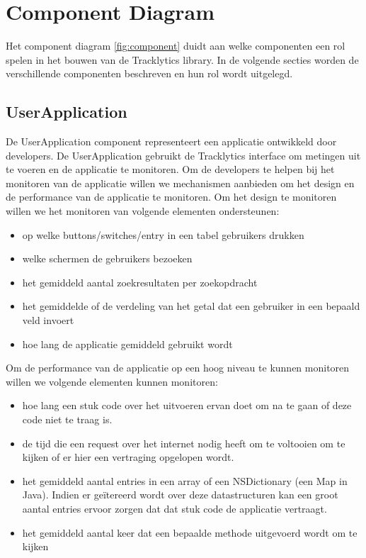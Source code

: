 \section{Component Diagram}
Het component diagram \ref{fig:component} duidt aan welke componenten een rol spelen in het bouwen van de Tracklytics library. In de volgende secties worden de verschillende componenten beschreven en hun rol wordt uitgelegd.


\subsection{UserApplication}
De UserApplication component representeert een applicatie ontwikkeld door developers. De UserApplication gebruikt de Tracklytics interface om metingen uit te voeren en de applicatie te monitoren. Om de developers te helpen bij het monitoren van de applicatie willen we mechanismen aanbieden om het design en de performance van de applicatie te monitoren. Om het design te monitoren willen we het monitoren van volgende elementen ondersteunen:
\begin{itemize}
\item op welke buttons/switches/entry in een tabel gebruikers drukken
\item welke schermen de gebruikers bezoeken
\item het gemiddeld aantal zoekresultaten per zoekopdracht
\item het gemiddelde of de verdeling van het getal dat een gebruiker in een bepaald veld invoert
\item hoe lang de applicatie gemiddeld gebruikt wordt
\end{itemize}

Om de performance van de applicatie op een hoog niveau te kunnen monitoren willen we volgende elementen kunnen monitoren:
\begin{itemize}
\item hoe lang een stuk code over het uitvoeren ervan doet om na te gaan of deze code niet te traag is.
\item de tijd die een request over het internet nodig heeft om te voltooien om te kijken of er hier een vertraging opgelopen wordt.
\item het gemiddeld aantal entries in een array of een NSDictionary (een Map in Java). Indien er ge\"itereerd wordt over deze datastructuren kan een groot aantal entries ervoor zorgen dat dat stuk code de applicatie vertraagt.
\item het gemiddeld aantal keer dat een bepaalde methode uitgevoerd wordt om te kijken

\end{itemize}


